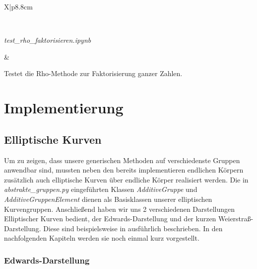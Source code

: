 \documentclass{scrartcl}
\begin{document}
\begin{table}[!ht]
\begin{tabularx}{\linewidth}{X|p{8.8cm}}
\begin{minipage}{\linewidth}
  \end{minipage} \\
  \hline
    \begin{minipage}{\linewidth}
    \emph{test\_rho\_faktorisieren.ipynb}
  \end{minipage} &
  \begin{minipage}{\linewidth}
      \vspace{2pt} Testet die Rho-Methode zur Faktorisierung ganzer Zahlen.   \vspace{2pt}
  \end{minipage}
\end{tabularx}
\renewcommand{\arraystretch}{1}
\caption{Übersicht der Jupyter Notebook Tests unserer Projektarbeit}
\label{tab:tests}
\end{table}


\section{Implementierung}
\label{sec:implementierung}

\subsection{Elliptische Kurven}
\label{sec:elliptische_kurven}

Um zu zeigen, dass unsere generischen Methoden auf verschiedenste Gruppen anwendbar sind, mussten neben den bereits implementieren endlichen Körpern zusätzlich auch elliptische Kurven über endliche Körper realisiert werden. 
Die in \emph{abstrakte\_gruppen.py} eingeführten Klassen \emph{AdditiveGruppe} und \emph{AdditiveGruppenElement} dienen als Basisklassen unserer elliptischen Kurvengruppen.
Anschließend haben wir uns 2 verschiedenen Darstellungen Elliptischer Kurven bedient, der Edwards-Darstellung und der kurzen Weierstraß-Darstellung. Diese sind beispielsweise in \cite{Galbraith2012} ausführlich beschrieben. In den nachfolgenden Kapiteln werden sie noch einmal kurz vorgestellt.

\subsubsection{Edwards-Darstellung}
\label{sec:edwards_kurven}
\end{document}
